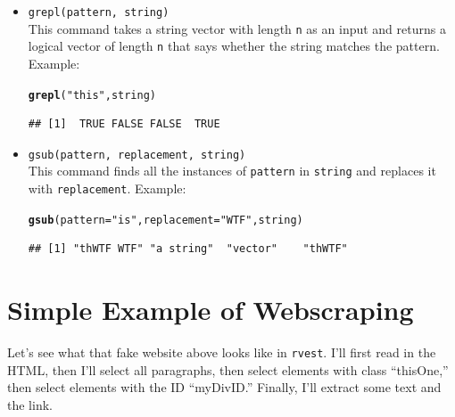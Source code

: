 \documentclass{article}\usepackage[]{graphicx}\usepackage[]{color}
\makeatletter
\newcommand{\hlstr}[1]{\textcolor[rgb]{0.192,0.494,0.8}{#1}}%
\newcommand{\hlstd}[1]{\textcolor[rgb]{0.345,0.345,0.345}{#1}}%
\newcommand{\hlkwc}[1]{\textcolor[rgb]{0.333,0.667,0.333}{#1}}%
\newcommand{\hlkwd}[1]{\textcolor[rgb]{0.737,0.353,0.396}{\textbf{#1}}}%
\newenvironment{kframe}{%
 \def\at@end@of@kframe{}%
 \ifinner\ifhmode%
  \def\at@end@of@kframe{\end{minipage}}%
  \begin{minipage}{\columnwidth}%
 \fi\fi%
 \def\FrameCommand##1{\hskip\@totalleftmargin \hskip-\fboxsep
 \colorbox{shadecolor}{##1}\hskip-\fboxsep
     \hskip-\linewidth \hskip-\@totalleftmargin \hskip\columnwidth}%
 \MakeFramed {\advance\hsize-\width
   \@totalleftmargin\z@ \linewidth\hsize
   \@setminipage}}%
 {\par\unskip\endMakeFramed%
 \at@end@of@kframe}
\newenvironment{knitrout}{}{} %
\makeatother
\begin{document}
\begin{itemize}
  \item \verb!grepl(pattern, string)! \\
  This command takes a string vector with length \texttt{n} as an input and returns a logical vector of length \texttt{n} that says whether the string matches the pattern. Example:
\begin{knitrout}
\color{fgcolor}\begin{kframe}
\begin{alltt}
\hlkwd{grepl}\hlstd{(}\hlstr{"this"}\hlstd{, string)}
\end{alltt}
\begin{verbatim}
## [1]  TRUE FALSE FALSE  TRUE
\end{verbatim}
\end{kframe}
\end{knitrout}
  \item \verb!gsub(pattern, replacement, string)! \\
  This command finds all the instances of \texttt{pattern} in \texttt{string} and replaces it with \texttt{replacement}. Example:
\begin{knitrout}
\color{fgcolor}\begin{kframe}
\begin{alltt}
\hlkwd{gsub}\hlstd{(}\hlkwc{pattern}\hlstd{=}\hlstr{"is"}\hlstd{,} \hlkwc{replacement}\hlstd{=}\hlstr{"WTF"}\hlstd{, string)}
\end{alltt}
\begin{verbatim}
## [1] "thWTF WTF" "a string"  "vector"    "thWTF"
\end{verbatim}
\end{kframe}
\end{knitrout}
  
\end{itemize}

\section{Simple Example of Webscraping}

Let's see what that fake website above looks like in \texttt{rvest}. I'll first read in the HTML, then I'll select all paragraphs, then select elements with class ``thisOne,'' then select elements with the ID ``myDivID.'' Finally, I'll extract some text and the link.
\end{document}
